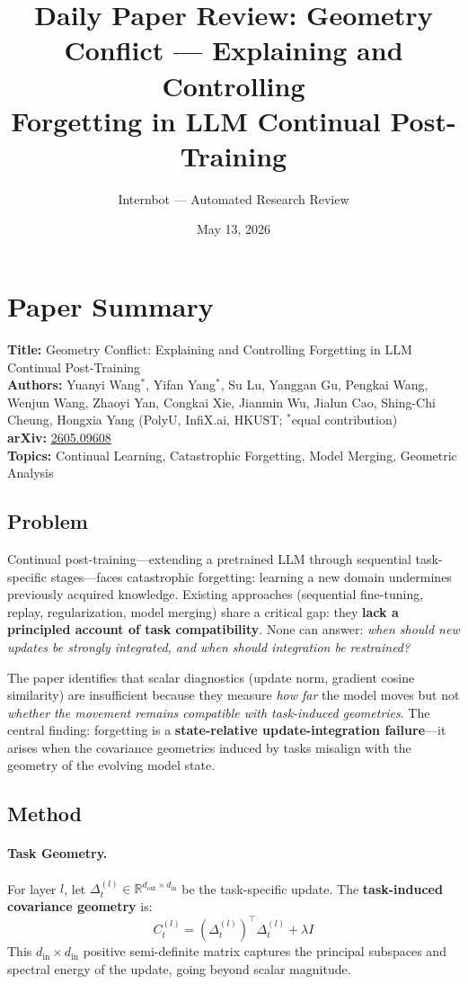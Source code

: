 \documentclass[11pt]{article}
\title{Daily Paper Review: Geometry Conflict --- Explaining and Controlling\\Forgetting in LLM Continual Post-Training}
\author{Internbot --- Automated Research Review}
\date{May 13, 2026}
\begin{document}
\maketitle

\section{Paper Summary}

\textbf{Title:} Geometry Conflict: Explaining and Controlling Forgetting in LLM Continual Post-Training \\
\textbf{Authors:} Yuanyi Wang$^*$, Yifan Yang$^*$, Su Lu, Yanggan Gu, Pengkai Wang, Wenjun Wang, Zhaoyi Yan, Congkai Xie, Jianmin Wu, Jialun Cao, Shing-Chi Cheung, Hongxia Yang (PolyU, InfiX.ai, HKUST; $^*$equal contribution) \\
\textbf{arXiv:} \href{https://arxiv.org/abs/2605.09608}{2605.09608} \\
\textbf{Topics:} Continual Learning, Catastrophic Forgetting, Model Merging, Geometric Analysis

\subsection{Problem}

Continual post-training---extending a pretrained LLM through sequential task-specific stages---faces catastrophic forgetting: learning a new domain undermines previously acquired knowledge. Existing approaches (sequential fine-tuning, replay, regularization, model merging) share a critical gap: they \textbf{lack a principled account of task compatibility}. None can answer: \emph{when should new updates be strongly integrated, and when should integration be restrained?}

The paper identifies that scalar diagnostics (update norm, gradient cosine similarity) are insufficient because they measure \emph{how far} the model moves but not \emph{whether the movement remains compatible with task-induced geometries}. The central finding: forgetting is a \textbf{state-relative update-integration failure}---it arises when the covariance geometries induced by tasks misalign with the geometry of the evolving model state.

\subsection{Method}

\paragraph{Task Geometry.}
For layer $l$, let $\Delta_t^{(l)} \in \mathbb{R}^{d_{\mathrm{out}} \times d_{\mathrm{in}}}$ be the task-specific update. The \textbf{task-induced covariance geometry} is:
\begin{equation}
    C_t^{(l)} = (\Delta_t^{(l)})^\top \Delta_t^{(l)} + \lambda I
\end{equation}
This $d_{\mathrm{in}} \times d_{\mathrm{in}}$ positive semi-definite matrix captures the principal subspaces and spectral energy of the update, going beyond scalar magnitude.
\end{document}
